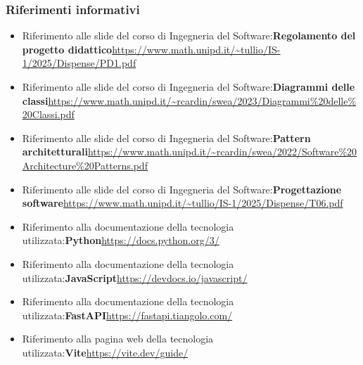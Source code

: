 \documentclass[a4paper,12pt]{article}
\begin{document}
        \subsubsection{Riferimenti informativi}
            \begin{itemize}
                \item Riferimento alle slide del corso di Ingegneria del Software:\newline \textbf{Regolamento del progetto didattico}\newline \url{https://www.math.unipd.it/~tullio/IS-1/2025/Dispense/PD1.pdf}
                \item Riferimento alle slide del corso di Ingegneria del Software:\newline \textbf{Diagrammi delle classi}\newline \url{https://www.math.unipd.it/~rcardin/swea/2023/Diagrammi%20delle%20Classi.pdf}
                \item Riferimento alle slide del corso di Ingegneria del Software:\newline \textbf{Pattern architetturali}\newline \url{https://www.math.unipd.it/~rcardin/swea/2022/Software%20Architecture%20Patterns.pdf}
                \item Riferimento alle slide del corso di Ingegneria del Software:\newline \textbf{Progettazione software}\newline \url{https://www.math.unipd.it/~tullio/IS-1/2025/Dispense/T06.pdf} 
                \item Riferimento alla documentazione della tecnologia utilizzata:\newline \textbf{Python}\newline \url{https://docs.python.org/3/}
                \item Riferimento alla documentazione della tecnologia utilizzata:\newline \textbf{JavaScript}\newline \url{https://devdocs.io/javascript/}
                \item Riferimento alla documentazione della tecnologia utilizzata:\newline \textbf{FastAPI}\newline \url{https://fastapi.tiangolo.com/}
                \item Riferimento alla pagina web della tecnologia utilizzata:\newline \textbf{Vite}\newline \url{https://vite.dev/guide/}

\end{itemize}
\end{document}
